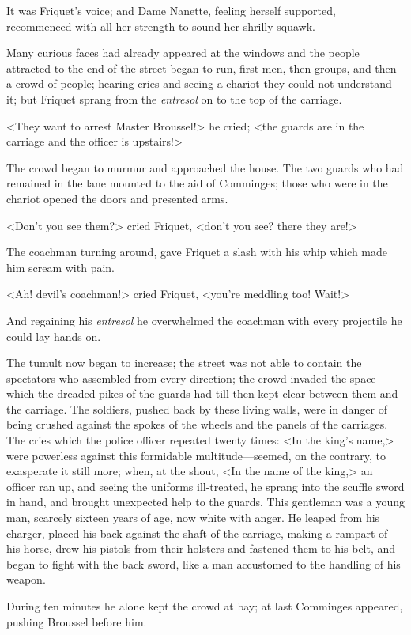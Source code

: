 It was Friquet's voice; and Dame Nanette, feeling herself supported, recommenced with all her strength to sound her shrilly squawk.

Many curious faces had already appeared at the windows and the people attracted to the end of the street began to run, first men, then groups, and then a crowd of people; hearing cries and seeing a chariot they could not understand it; but Friquet sprang from the \textit{entresol} on to the top of the carriage.

<They want to arrest Master Broussel!> he cried; <the guards are in the carriage and the officer is upstairs!>

The crowd began to murmur and approached the house. The two guards who had remained in the lane mounted to the aid of Comminges; those who were in the chariot opened the doors and presented arms.

<Don't you see them?> cried Friquet, <don't you see? there they are!>

The coachman turning around, gave Friquet a slash with his whip which made him scream with pain.

<Ah! devil's coachman!> cried Friquet, <you're meddling too! Wait!>

And regaining his \textit{entresol} he overwhelmed the coachman with every projectile he could lay hands on.

The tumult now began to increase; the street was not able to contain the spectators who assembled from every direction; the crowd invaded the space which the dreaded pikes of the guards had till then kept clear between them and the carriage. The soldiers, pushed back by these living walls, were in danger of being crushed against the spokes of the wheels and the panels of the carriages. The cries which the police officer repeated twenty times: <In the king's name,> were powerless against this formidable multitude—seemed, on the contrary, to exasperate it still more; when, at the shout, <In the name of the king,> an officer ran up, and seeing the uniforms ill-treated, he sprang into the scuffle sword in hand, and brought unexpected help to the guards. This gentleman was a young man, scarcely sixteen years of age, now white with anger. He leaped from his charger, placed his back against the shaft of the carriage, making a rampart of his horse, drew his pistols from their holsters and fastened them to his belt, and began to fight with the back sword, like a man accustomed to the handling of his weapon.

During ten minutes he alone kept the crowd at bay; at last Comminges appeared, pushing Broussel before him.

